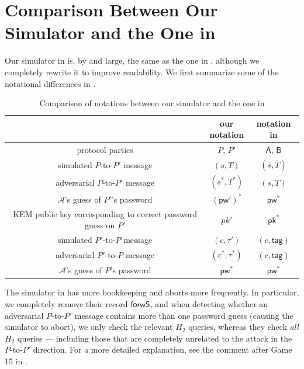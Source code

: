 \documentclass{article}
\theoremstyle{plain}
\theoremstyle{definition}
\theoremstyle{remark}
\newcommand{\adv}{\mathcal{A}}
\newcommand{\pw}{\mathsf{pw}}
\begin{document}
\section{Comparison Between Our Simulator and the One in \cite{EPRINT:ArrBarJar25}}
\label{app:comparison}
Our simulator in  is, by and large, the same as the one in \cite[Fig.5~and~6]{EPRINT:ArrBarJar25}, although we completely rewrite it to improve readability. We first summarize some of the notational differences in .
\begin{table}[H]\centering
\begin{tabular}{ |c|c|c| }
\hline
 & \makecell{our \\ notation} & \makecell{notation in \\ \cite{EPRINT:ArrBarJar25}} \\
\hline
protocol parties & $P$, $P'$ & $\mathsf{A}$, $\mathsf{B}$ \\
\hline
simulated $P$-to-$P'$ message & $(s,T)$ & $(\overline{s},\overline{T})$ \\
\hline
adversarial $P$-to-$P'$ message & $(s^*,T^*)$ & $(s,T)$ \\
\hline
$\adv$'s guess of $P'$'s password & $(\pw')^*$ & $\pw^*$ \\
\hline
\makecell{KEM public key corresponding to \\ correct password guess on $P'$} & $pk'$ & $\mathsf{pk}^*$ \\
\hline
simulated $P'$-to-$P$ message & $(c,\tau')$ & $(c,\mathsf{tag})$ \\
\hline
adversarial $P'$-to-$P$ message & $(c^*,\tau^*)$ & $(c,\mathsf{tag})$ \\
\hline
$\adv$'s guess of $P$'s password & $\pw^*$ & $\pw^*$ \\
\hline
\end{tabular}
\caption{Comparison of notations between our simulator and the one in \cite{EPRINT:ArrBarJar25}}
\label{tab:sim-notations}
\end{table}

The simulator in \cite{EPRINT:ArrBarJar25} has more bookkeeping and aborts more frequently. In particular, we completely remove their record $\mathsf{forwS}$, and when detecting whether an adversarial $P$-to-$P'$ message contains more than one password guess (causing the simulator to abort), we only check the relevant $H_2$ queries, whereas they check \emph{all} $H_2$ queries --- including those that are completely unrelated to the attack in the $P$-to-$P'$ direction. For a more detailed explanation, see the comment after Game 15 in .
\end{document}
